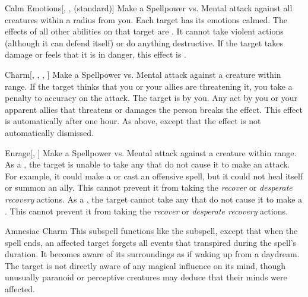\begin{ability}[\nth{3}]{Calm Emotions}[, ,  (standard)]
Make a Spellpower vs. Mental attack against all creatures within a \areamed radius from you.
\hit Each target has its emotions calmed.
The effects of all other  abilities on that target are .
It cannot take violent actions (although it can defend itself) or do anything destructive.
If the target takes damage or feels that it is in danger, this effect is .
\end{ability}
\vspace{0.25em}


\begin{ability}[\nth{3}]{Charm}[, , , ]
Make a Spellpower vs. Mental attack against a creature within \rngmed range.
If the target thinks that you or your allies are threatening it, you take a  penalty to accuracy on the attack.
\hit The target is \charmed by you.
Any act by you or your apparent allies that threatens or damages the  person breaks the effect.
This effect is automatically  after one hour.
\crit As above, except that the effect is not automatically dismissed.
\end{ability}
\vspace{0.25em}


\begin{ability}[\nth{4}]{Enrage}[, ]
Make a Spellpower vs. Mental attack against a creature within \rngmed range.
\hit As a , the target is unable to take any  that do not cause it to make an attack.
For example, it could make a  or cast an offensive spell, but it could not heal itself or summon an ally.
This cannot prevent it from taking the \textit{recover} or \textit{desperate recovery} actions.
\crit As a , the target cannot take any  that do not cause it to make a .
This cannot prevent it from taking the \textit{recover} or \textit{desperate recovery} actions.
\end{ability}
\vspace{0.25em}


\begin{ability}[\nth{7}]{Amnesiac Charm}
This subspell functions like the  subspell, except that when the spell ends, an affected target forgets all events that transpired during the spell's duration.
It becomes aware of its surroundings as if waking up from a daydream.
The target is not directly aware of any magical influence on its mind, though unusually paranoid or perceptive creatures may deduce that their minds were affected.
\end{ability}
\vspace{0.25em}

